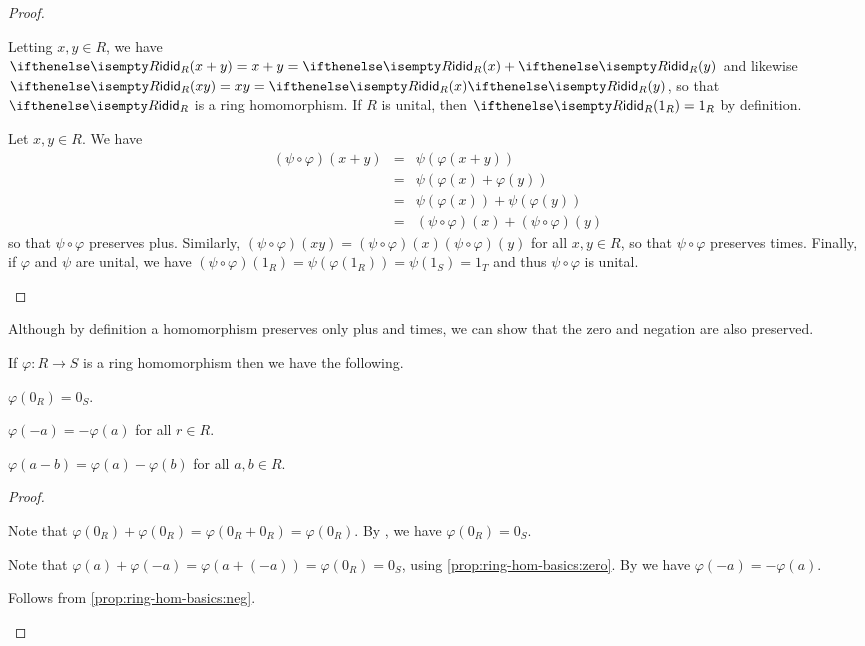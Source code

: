 \begin{proof}
\begin{inlineproplist}
\item Letting \(x,y \in R\), we have \(\ID[R](x+y) = x+y = \ID[R](x) + \ID[R](y)\) and likewise \(\ID[R](xy) = xy = \ID[R](x)\ID[R](y)\), so that \(\ID[R]\) is a ring homomorphism.
If \(R\) is unital, then \(\ID[R](1_R) = 1_R\) by definition.
\item Let \(x,y \in R\).
We have
\begin{eqnarray*}
(\psi \circ \varphi)(x+y)
 & = & \psi(\varphi(x+y)) \\
 & = & \psi(\varphi(x) + \varphi(y)) \\
 & = & \psi(\varphi(x)) + \psi(\varphi(y)) \\
 & = & (\psi \circ \varphi)(x) + (\psi \circ \varphi)(y)
\end{eqnarray*}
so that \(\psi \circ \varphi\) preserves plus.
Similarly, \((\psi \circ \varphi)(xy) = (\psi \circ \varphi)(x)(\psi \circ \varphi)(y)\) for all \(x,y \in R\), so that \(\psi \circ \varphi\) preserves times.
Finally, if \(\varphi\) and \(\psi\) are unital, we have \((\psi \circ \varphi)(1_R) = \psi(\varphi(1_R)) = \psi(1_S) = 1_T\) and thus \(\psi \circ \varphi\) is unital.
\end{inlineproplist}
\end{proof}

Although by definition a homomorphism preserves only plus and times, we can show that the zero and negation are also preserved.

\begin{prop} \label{prop:ring-hom-basics}
If \(\varphi : R \rightarrow S\) is a ring homomorphism then we have the following.
\begin{proplist}
\item \label{prop:ring-hom-basics:zero} \(\varphi(0_R) = 0_S\).
\item \label{prop:ring-hom-basics:neg} \(\varphi(-a) = -\varphi(a)\) for all \(r \in R\).
\item \label{prop:ring-hom-basics:minus} \(\varphi(a-b) = \varphi(a) - \varphi(b)\) for all \(a,b \in R\).
\end{proplist}
\end{prop}

\begin{proof}
\begin{inlineproplist}
\item Note that \(\varphi(0_R) + \varphi(0_R) = \varphi(0_R + 0_R) = \varphi(0_R)\).
By , we have \(\varphi(0_R) = 0_S\).
\item Note that \(\varphi(a) + \varphi(-a) = \varphi(a + (-a)) = \varphi(0_R) = 0_S\), using \ref{prop:ring-hom-basics:zero}.
By  we have \(\varphi(-a) = -\varphi(a)\).
\item Follows from \ref{prop:ring-hom-basics:neg}.
\end{inlineproplist}
\end{proof}

